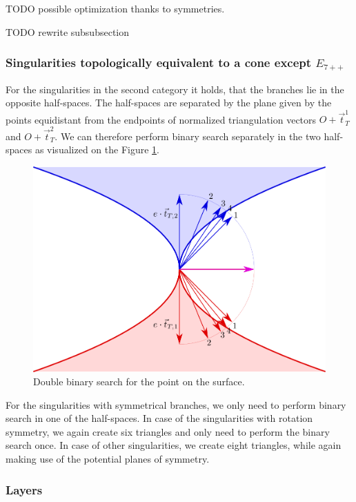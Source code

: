 TODO possible optimization thanks to symmetries.

TODO rewrite subsubsection
\subsubsection*{Singularities topologically equivalent to a cone except $E_{7++}$}
For the singularities in the second category it holds, that the branches lie in 
the opposite half-spaces. The half-spaces are separated by the plane given by
the points equidistant from the endpoints of normalized triangulation vectors
$O+\vec{t}_T^1$ and $O+\vec{t}_T^2$. We can therefore perform binary search
separately in the two half-spaces as visualized on the Figure \ref{img:45}.

\begin{figure}
    \centerline{\includegraphics[scale=0.5]{images/img45}}
    \caption[Double binary search for the point on the surface]
    {Double binary search for the point on the surface.}
    \label{img:45}
\end{figure}

For the singularities with symmetrical branches, we only need to perform binary
search in one of the half-spaces. In case of the singularities with rotation
symmetry, we again create six triangles and only need to perform the binary search once.
In case of other singularities, we create eight triangles, while again making use of the
potential planes of symmetry.

\subsubsection*{Layers}

